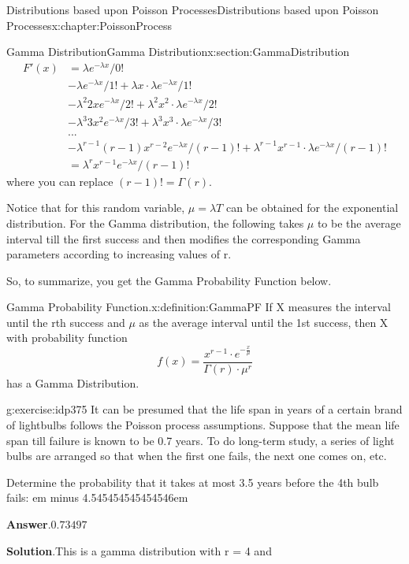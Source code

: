 \documentclass[oneside,10pt,]{book}
\newcommand{\blocktitlefont}{\relax}
\newcommand{\fillin}[1]{\leavevmode\leaders\vrule height -1.2pt depth 1.5pt \hskip #1em minus #1em \null}
\numberwithin{equation}{section}
\begin{document}
\begin{chapterptx}{Distributions based upon Poisson Processes}{}{Distributions based upon Poisson Processes}{}{}{x:chapter:PoissonProcess}
\begin{sectionptx}{Gamma Distribution}{}{Gamma Distribution}{}{}{x:section:GammaDistribution}
\begin{align*}
F'(x) & = \lambda e^{-\lambda x}/0!\\
& - \lambda e^{-\lambda x}/1! + \lambda x \cdot \lambda e^{-\lambda x}/1!\\
& - \lambda^2 2x e^{-\lambda x}/2! + \lambda^2 x^2 \cdot \lambda e^{-\lambda x}/2!\\
& - \lambda^3 3x^2 e^{-\lambda x}/3! + \lambda^3 x^3 \cdot \lambda e^{-\lambda x}/3!\\
& . . .\\
& - \lambda^{r-1} (r-1)x^{r-2} e^{-\lambda x}/(r-1)! + \lambda^{r-1} x^{r-1} \cdot \lambda e^{-\lambda x}/(r-1)!\\
& = \lambda^r x^{r-1} e^{-\lambda x}/(r-1)!
\end{align*}
where you can replace \((r-1)! = \Gamma(r)\).%
\par
Notice that for this random variable, \(\mu = \lambda T\) can be obtained for the exponential distribution. For the Gamma distribution, the following takes \(\mu\) to be the average interval till the first success and then modifies the corresponding Gamma parameters according to increasing values of r.%
\par
So, to summarize, you get the Gamma Probability Function below.%
\begin{definition}{Gamma Probability Function.}{x:definition:GammaPF}%
If X measures the interval until the rth success and \(\mu\) as the average interval until the 1st success, then X with probability function%
\begin{equation*}
f(x) =  \frac{x^{r-1} \cdot e^{-\frac{x}{\mu}}}{\Gamma(r) \cdot \mu^r}
\end{equation*}
has a Gamma Distribution.%
\end{definition}
\begin{inlineexercise}{}{g:exercise:idp375}%
It can be presumed that the life span in years of a certain brand of lightbulbs follows the Poisson process assumptions.  Suppose that the mean life span till failure is known to be 0.7 years. To do long-term study, a series of light bulbs are arranged so that when the first one fails, the next one comes on, etc.%
\par
Determine the probability that it takes at most 3.5 years before the 4th bulb fails: \fillin{4.545454545454546}%
\par\smallskip%
\noindent\textbf{\blocktitlefont Answer}.\hypertarget{g:answer:idp376}{}\quad{}\(0.73497\)%
\par\smallskip%
\noindent\textbf{\blocktitlefont Solution}.\hypertarget{g:solution:idp377}{}\quad{}This is a gamma distribution with r = 4 and%

\end{inlineexercise}
\end{sectionptx}
\end{chapterptx}
\end{document}
